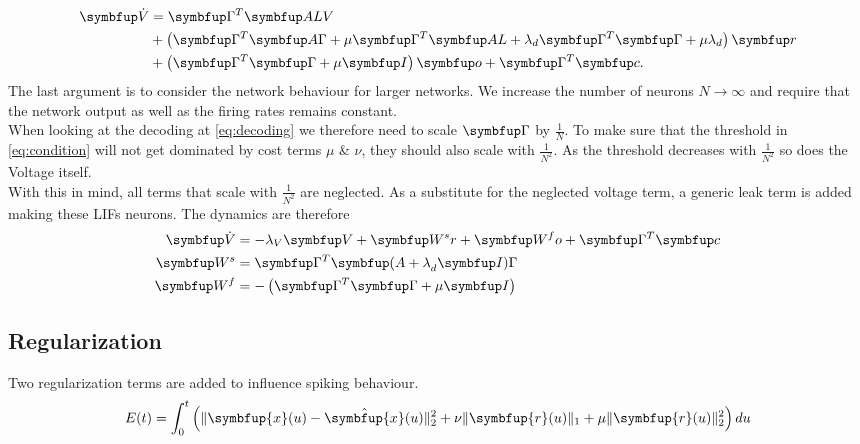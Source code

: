 \begin{equation}\label{eq:voltage_limit}
\begin{aligned}
	\bmu{\dot{V}} &= \bmu{\Gamma}^T\bmu{ALV}\\
	 &+ \left(\bmu{\Gamma}^T\bmu{A\Gamma} + \mu\bmu{\Gamma}^T \bmu{AL}+\lambda_d\bmu{\Gamma}^T\bmu{\Gamma} + \mu\lambda_d\right)\bmu{r}\\
	 &+\left(\bmu{\Gamma}^T\bmu{\Gamma} + \mu\bmu{I}\right)\bmu{o} + \bmu{\Gamma}^T\bmu{c}.
\end{aligned}
\end{equation}
The last argument is to consider the network behaviour for larger networks. We increase the number of neurons $N\longrightarrow\infty$ and require that the network output as well as the firing rates remains constant.\\
When looking at the decoding at \cref{eq:decoding} we therefore need to scale $\bmu{\Gamma}$ by $\frac{1}{N}$. To make sure that the threshold in \cref{eq:condition} will not get dominated by cost terms $\mu$ \& $\nu$, they should also scale with $\frac{1}{N^2}$. As the threshold decreases with $\frac{1}{N^2}$ so does the Voltage itself.\\
With this in mind, all terms that scale with $\frac{1}{N^2}$ are neglected. As a substitute for the neglected voltage term, a generic leak term is added making these \acp{LIF} neurons. The dynamics are therefore
\begin{equation}\label{eq:simple_sim}
\begin{aligned}
	\bmu{\dot{V}} &= -\lambda_V \bmu{V} + \bmu{W^sr} + \bmu{W^fo} + \bmu{\Gamma}^T \bmu{c}\\
	\bmu{W^s} &= \bmu{\Gamma}^T\bmu{(A+\lambda}_d\bmu{I)\Gamma}\\
	\bmu{W^f} & = -\left(\bmu{\Gamma}^T\bmu{\Gamma} + \mu\bmu{I}\right)
\end{aligned}
\end{equation}

\subsection{Regularization}\label{sssection:regularization}

Two regularization terms are added to influence spiking behaviour.\\
\begin{equation}\label{eq:cost_func}
E(t)=\int_0^t \left(\|\symbfup{x}(u)-\hat{\symbfup{x}}(u)\|_2^2+\nu\|\symbfup{r}(u)\|_1+\mu\|\symbfup{r}(u)\|_2^2\right)d u
\end{equation}

